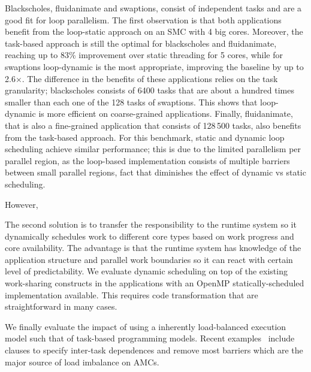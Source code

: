 Blackscholes, fluidanimate and swaptions, consist of independent tasks and are a good fit for loop parallelism. 
The first observation is that both applications benefit from the loop-static approach on an SMC with 4 big cores. 
Moreover, the task-based approach is still the optimal for blackscholes and fluidanimate, reaching up to 83\% improvement over static threading for 5 cores, while for swaptions loop-dynamic is the most appropriate, improving the baseline by up to 2.6$\times$.
The difference in the benefits of these applications relies on the task granularity; blackscholes consists of 6400 tasks that are about a hundred times smaller than each one of the 128 tasks of swaptions. 
This shows that loop-dynamic is more efficient on coarse-grained applications.
Finally, fluidanimate, that is also a fine-grained application that consists of 128\,500 tasks, also benefits from the task-based approach. 
For this benchmark, static and dynamic loop scheduling achieve similar performance; this is due to the limited parallelism per parallel region, as the loop-based implementation consists of multiple barriers between small parallel regions, fact that diminishes the effect of dynamic vs static scheduling. 



  \iffalse
However, 

The second solution is to transfer the responsibility to the runtime system so it dynamically 
schedules work to different core types based on work progress and core availability. The advantage 
is that the runtime system has knowledge of the application structure and parallel work boundaries 
so it can react with certain level of predictability. We evaluate dynamic scheduling on top of the 
existing work-sharing constructs in the applications with an OpenMP statically-scheduled 
implementation available. This requires code transformation that are straightforward in many cases.

We finally evaluate the impact of using a inherently load-balanced execution model such that of 
task-based programming models. Recent examples~\cite{Ayguade:TPDS2009, OpenMP4.0:Manual2013, 
OmpSs_PPL11, Zuckerman:EXADAPT2011, Bauer.2012.SC, Vandierendonck:PACT2011, Vandierendonck:Hyperq} 
include clauses to specify inter-task dependences and remove most barriers which are the major 
source of load imbalance on AMCs.

